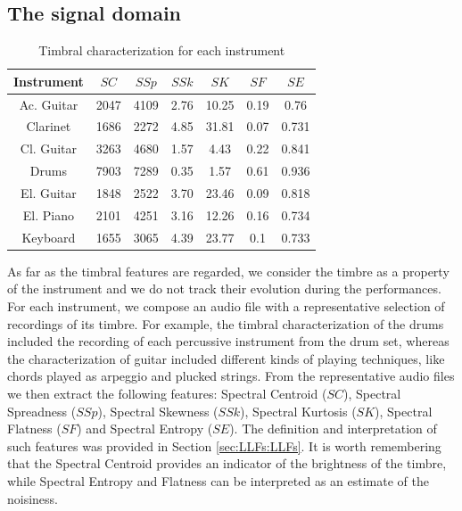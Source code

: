 \subsection{The signal domain}\label{sec:NMP:domain}

\begin{table}[tb]
  \caption{Timbral characterization for each instrument}
  \centering %
  \label{tab:NMP:instruments}
  \bgroup
  \def\arraystretch{1.5}
\begin{tabular}{||c|c|c|c|c|c|c||}
 \hline
 \hline
 Instrument  & $SC$ & $SSp$ & $SSk$ & $SK$ & $SF$ & $SE$ \\
 \hline
 \hline
Ac. Guitar &   2047 & 4109 & 2.76 & 10.25 & 0.19 & 0.76 \\
Clarinet & 1686 & 2272 & 4.85 & 31.81 & 0.07 & 0.731 \\
Cl. Guitar &   3263 & 4680 & 1.57 & 4.43 & 0.22 & 0.841 \\
Drums & 7903 & 7289 & 0.35 & 1.57 & 0.61 & 0.936 \\
El. Guitar & 1848 & 2522 & 3.70 & 23.46 & 0.09 & 0.818 \\
El. Piano & 2101 & 4251 & 3.16 & 12.26 & 0.16 & 0.734 \\
Keyboard & 1655 & 3065 & 4.39 & 23.77 & 0.1 & 0.733 \\
 \hline
 \hline
   \end{tabular}
   \egroup
\end{table}

As far as the timbral features are regarded, we consider the timbre as a property of the instrument and we do not track their evolution during the performances. For each instrument, we compose an audio file with a representative selection of recordings of its timbre. For example, the timbral characterization of the drums included the recording of each percussive instrument from the drum set, whereas the characterization of guitar included different kinds of playing techniques, like chords played as arpeggio and plucked strings. From the representative audio files we then extract the following features: Spectral Centroid ($SC$), Spectral Spreadness ($SSp$), Spectral Skewness ($SSk$), Spectral Kurtosis ($SK$), Spectral Flatness ($SF$) and Spectral Entropy ($SE$). The definition and interpretation of such features was provided in Section \ref{sec:LLFs:LLFs}. It is worth remembering that the Spectral Centroid provides an indicator of the brightness of the timbre, while Spectral Entropy and Flatness can be interpreted as an estimate of the noisiness. 

